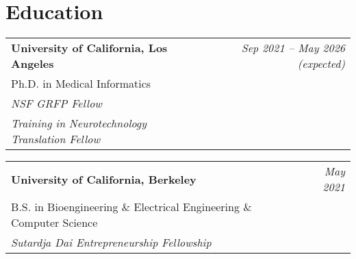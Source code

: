 \section*{Education}

\begin{tabularx}{\linewidth}{@{}X r@{}}
	\textbf{University of California, Los Angeles} & \textit{Sep 2021 -- May 2026 (expected)} \\
	Ph.D. in Medical Informatics & \\
    \textit{NSF GRFP Fellow} \\
    \textit{Training in Neurotechnology Translation Fellow}
\end{tabularx}
\vspace{0.4em}

\begin{tabularx}{\linewidth}{@{}X r@{}}
	\textbf{University of California, Berkeley} & \textit{May 2021} \\
	B.S. in Bioengineering \& Electrical Engineering \& Computer Science & \\
    \textit{Sutardja Dai Entrepreneurship Fellowship}
\end{tabularx}

